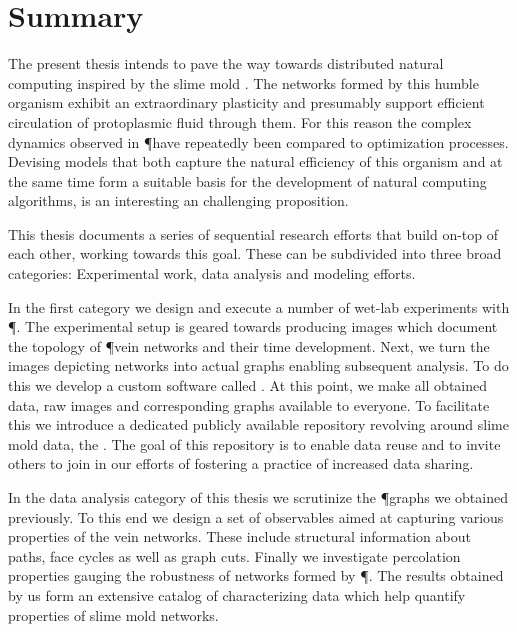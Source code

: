 \chapter{Summary}

	
	The present thesis intends to pave the way towards distributed natural computing inspired by the slime mold \Pp. The networks formed by this humble organism exhibit an extraordinary plasticity and presumably support efficient circulation of protoplasmic fluid through them. For this reason the complex dynamics observed in \P have repeatedly been compared to optimization processes. 
	Devising models that both capture the natural efficiency of this organism and at the same time form a suitable basis for the development of natural computing algorithms, is an interesting an challenging proposition.
	
	This thesis documents a series of sequential research efforts that build on-top of each other, working towards this goal. These can be subdivided into three broad categories: Experimental work, data analysis and modeling efforts.

	In the first category we design and execute a number of wet-lab experiments with \P. The experimental setup is geared towards producing images which document the topology of \P vein networks and their time development. Next, we turn the images depicting networks into actual graphs enabling subsequent analysis. To do this we develop a custom software called \NEFI. At this point, we make all obtained data, \ie raw images and corresponding graphs available to everyone. To facilitate this we introduce a dedicated publicly available repository revolving around slime mold data, the \SMGR. The goal of this repository is to enable data reuse and to invite others to join in our efforts of fostering a practice of increased data sharing.

	In the data analysis category of this thesis we scrutinize the \P graphs we obtained previously. To this end we design a set of observables aimed at capturing various properties of the vein networks. These include structural information about paths, face cycles as well as graph cuts. Finally we investigate percolation properties gauging the robustness of networks formed by \P. The results obtained by us form an extensive catalog of characterizing data which help quantify properties of slime mold networks.


